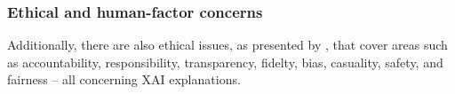 
\subsubsection*{Ethical and human-factor concerns}
Additionally, there are also ethical issues, as presented by \cite{hanif2021survey}, that cover areas such as accountability, responsibility, transparency, fidelty, bias, casuality, safety, and fairness -- all concerning XAI explanations.
